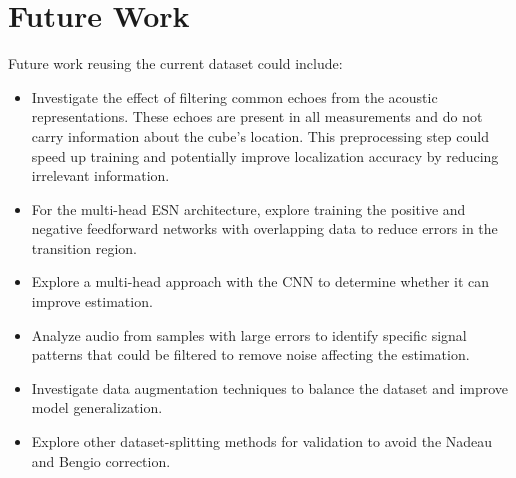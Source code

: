 \section{Future Work}

Future work reusing the current dataset could include:
\begin{itemize}
	\item Investigate the effect of filtering common echoes from the acoustic representations. These echoes are present in all measurements and do not carry information about the cube's location. This preprocessing step could speed up training and potentially improve localization accuracy by reducing irrelevant information.
	\item For the multi-head ESN architecture, explore training the positive and negative feedforward networks with overlapping data to reduce errors in the transition region.
	\item Explore a multi-head approach with the CNN to determine whether it can improve estimation.
	\item Analyze audio from samples with large errors to identify specific signal patterns that could be filtered to remove noise affecting the estimation.
	\item Investigate data augmentation techniques to balance the dataset and improve model generalization.
	\item Explore other dataset-splitting methods for validation to avoid the Nadeau and Bengio correction.
	
\end{itemize}
